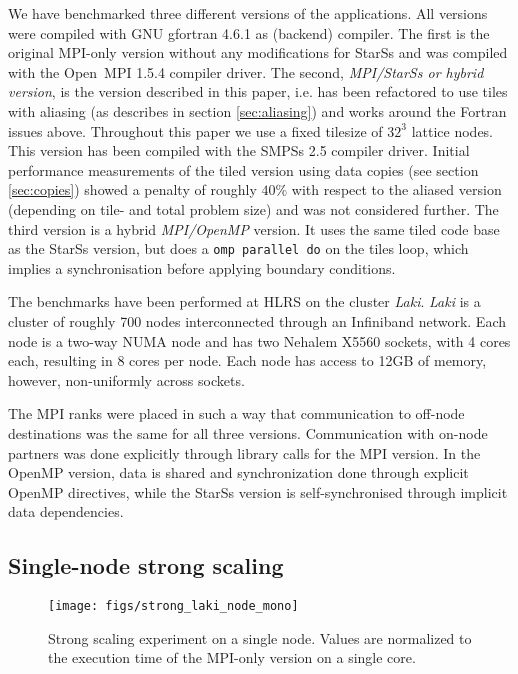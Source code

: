 \documentclass[conference]{IEEEtran}
\newcommand{\starss}{{StarSs}}
\newcommand{\smpss}{{SMPSs}}
\newcommand{\laki}{{\em Laki}}
\begin{document}
We have benchmarked three different versions of the applications. All
versions were compiled with GNU gfortran 4.6.1 as (backend)
compiler. The first is the original MPI-only version without any
modifications for \starss{} and was compiled with the Open~MPI 1.5.4
compiler driver. The second, \emph{MPI/\starss{} or hybrid version},
is the version described in this paper, i.e. has been refactored to
use tiles with aliasing (as describes in section \ref{sec:aliasing})
and works around the Fortran issues above. Throughout this paper we
use a fixed tilesize of \mbox{$32^3$} lattice nodes. This version has
been compiled with the \smpss{} 2.5 compiler driver. Initial
performance measurements of the tiled version using data copies (see
section \ref{sec:copies}) showed a penalty of roughly $40\%$ with
respect to the aliased version (depending on tile- and total problem
size) and was not considered further. The third version is a hybrid
\emph{MPI/OpenMP} version.  It uses the same tiled code base as the
\starss{} version, but does a \verb!omp parallel do! on the tiles
loop, which implies a synchronisation before applying boundary
conditions.


The benchmarks have been performed at HLRS on the cluster
\laki{}\cite{laki:web}. \laki{} is a cluster of roughly 700 nodes
interconnected through an Infiniband network. Each node is a two-way NUMA node
and has two Nehalem X5560 sockets, with 4 cores each, resulting in 8 cores per
node. Each node has access to 12GB of memory, however, non-uniformly across
sockets.

The MPI ranks were placed in such a way that 
communication to off-node destinations was the same for all
three versions. Communication with on-node partners was done
explicitly through library calls for the MPI version. In the OpenMP
version, data is shared and synchronization done through explicit
OpenMP directives, while the StarSs version is self-synchronised
through implicit data dependencies.

\subsection*{Single-node strong scaling}

\begin{figure}[!t]\centering
\texttt{[image: figs/strong\_laki\_node\_mono]}
\caption{Strong scaling experiment on a single node. Values are
  normalized to the execution time of the MPI-only version on a single
  core.}
  \label{fig:strong}
\end{figure}
\end{document}
